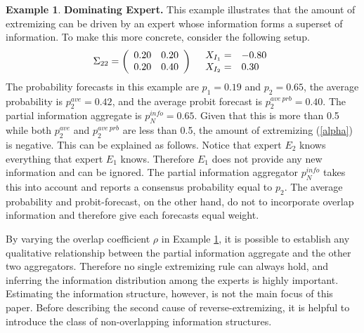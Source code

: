 \documentclass[11pt]{article}
\theoremstyle{definition}
\newtheorem{example}[theorem]{Example}
\theoremstyle{definition}
\begin{document}
\begin{example}
\label{Example1}
\textbf{Dominating Expert.} This example illustrates that the amount of extremizing can be driven by an expert whose information forms a superset of information. To make this more concrete, consider the following setup.
\begin{align*}
\Sigma_{22} =  \left(\begin{array}{c c}
0.20 & 0.20\\
0.20 & 0.40 \\
 \end{array}\right)
  && 
  \begin{array}{l l}
X_{I_1} =& -0.80\\
X_{I_2} =& 0.30
 \end{array}
\end{align*}
The probability forecasts in this example are $p_1 = 0.19$ and $p_2 = 0.65$, the average probability is $p_2^{ave}  = 0.42$, and the average probit forecast is $p_2^{ave\ prb} = 0.40$. 
The partial information aggregate is $p_N^{info} = 0.65$.  Given that this is more than 0.5 while both $p_2^{ave}$ and $p_2^{ave\ prb}$ are less than 0.5, the amount of extremizing (\ref{alpha}) is negative. This can be explained as follows. Notice that expert $E_2$ knows everything that expert $E_1$ knows. Therefore $E_1$ does not provide any new information and can be ignored. The partial information aggregator $p_N^{info}$ takes this into account and reports a consensus probability equal to $p_2$. The average probability and probit-forecast, on the other hand, do not to incorporate overlap information and therefore give each forecasts equal weight. 
\end{example}

By varying the overlap coefficient $\rho$ in Example \ref{Example1}, it is possible to establish any qualitative relationship between the partial information aggregate and the other two aggregators. Therefore no single extremizing rule can always hold, and inferring the information distribution among the experts is highly important. Estimating the information structure, however, is not the main focus of this paper. Before describing the second cause of reverse-extremizing, it is helpful to introduce the class of non-overlapping information structures. 
\end{document}
